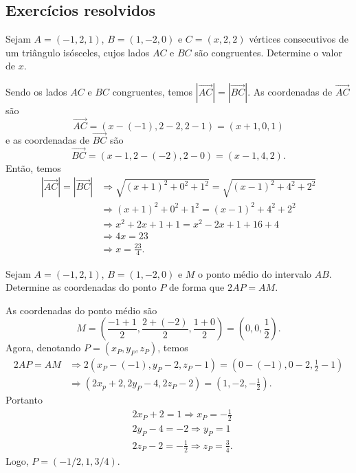 \subsection*{Exercícios resolvidos}

\begin{exeresol}
  Sejam $A = (-1,2,1)$, $B = (1,-2,0)$ e $C = (x,2,2)$ vértices consecutivos de um triângulo isósceles, cujos lados $AC$ e $BC$ são congruentes. Determine o valor de $x$.
\end{exeresol}
\begin{resol}
  Sendo os lados $AC$ e $BC$ congruentes, temos $|\overrightarrow{AC}| = |\overrightarrow{BC}|$. As coordenadas de $\overrightarrow{AC}$ são
  \begin{equation}
    \overrightarrow{AC} = (x-(-1),2-2,2-1) = (x+1,0,1)
  \end{equation}
  e as coordenadas de $\overrightarrow{BC}$ são
  \begin{equation}
    \overrightarrow{BC} = (x-1,2-(-2),2-0) = (x-1,4,2).
  \end{equation}
  Então, temos
  \begin{align}
    |\overrightarrow{AC}| = |\overrightarrow{BC}| &\Rightarrow \sqrt{(x+1)^2+0^2+1^2} = \sqrt{(x-1)^2+4^2+2^2}\\
                                                  &\Rightarrow (x+1)^2+0^2+1^2 = (x-1)^2+4^2+2^2\\
                                                  &\Rightarrow x^2+2x+1+1 = x^2-2x+1+16+4\\
                                                  &\Rightarrow 4x = 23\\
                                                  &\Rightarrow x = \frac{23}{4}.
  \end{align}
\end{resol}

\begin{exeresol}
  Sejam $A = (-1,2,1)$, $B = (1,-2,0)$  e $M$ o ponto médio do intervalo $AB$. Determine as coordenadas do ponto $P$ de forma que $2AP = AM$.
\end{exeresol}
\begin{resol}
  As coordenadas do ponto médio são
  \begin{equation}
    M = \left(\frac{-1+1}{2},\frac{2+(-2)}{2},\frac{1+0}{2}\right) = \left(0,0,\frac{1}{2}\right).
  \end{equation}
  Agora, denotando $P = (x_P,y_P,z_P)$, temos
  \begin{align}
    2AP = AM &\Rightarrow 2(x_P-(-1),y_P-2,z_P-1) = \left(0-(-1),0-2,\frac{1}{2}-1\right)\\
             &\Rightarrow (2x_p+2,2y_P-4,2z_P-2) = \left(1,-2,-\frac{1}{2}\right).
  \end{align}
  Portanto
  \begin{align}
    & 2x_P+2 = 1 \Rightarrow x_P = -\frac{1}{2}\\
    & 2y_P-4 = -2 \Rightarrow y_P = 1\\
    & 2z_P-2 = -\frac{1}{2} \Rightarrow z_P = \frac{3}{4}.
  \end{align}
  Logo, $P = (-1/2,1,3/4)$.
\end{resol}

